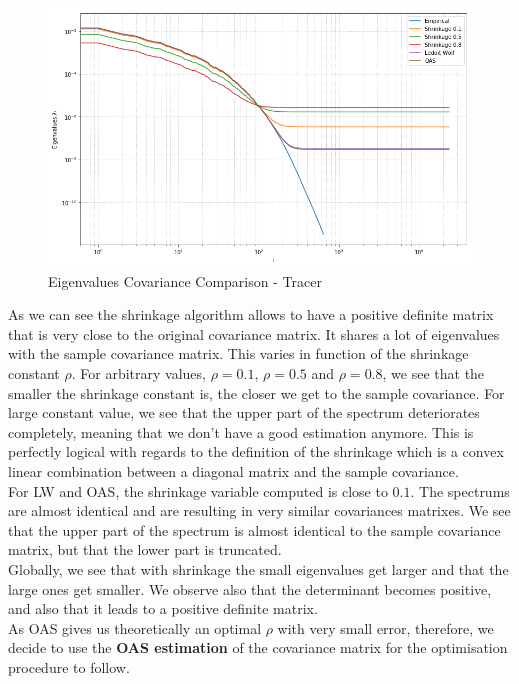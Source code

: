 \begin{figure}[h!]
\centering
    \includegraphics[width=0.8\linewidth]{figures/Covariance/Tracer_23643/cov_all_eigenval_loglog_zoom}
    \caption{Eigenvalues Covariance Comparison - Tracer}
    \label{fig:cov:comparison:eigs}
\end{figure}

As we can see the shrinkage algorithm allows to have a positive definite matrix that is very close to the original covariance matrix. It shares a lot of eigenvalues with the sample covariance matrix. This varies in function of the shrinkage constant $\rho$. For arbitrary values, $\rho = 0.1$,  $\rho= 0.5$ and  $\rho= 0.8$, we see that the smaller the shrinkage constant is, the closer we get to the sample covariance. For large constant value, we see that the upper part of the spectrum deteriorates completely, meaning that we don't have a good estimation anymore. This is perfectly logical with regards to the definition of the shrinkage which is a convex linear combination between a diagonal matrix and the sample covariance. \\

For LW and OAS, the shrinkage variable computed is close to $0.1$. The spectrums are almost identical and are resulting in very similar covariances matrixes. We see that the upper part of the spectrum is almost identical to the sample covariance matrix, but that the lower part is truncated. \\


Globally, we see that with shrinkage  the small eigenvalues get larger and that the large ones get smaller. We observe also that the determinant becomes positive, and also that it leads to a positive definite matrix. \\

As OAS gives us theoretically an optimal $\rho$ with very small error, therefore, we decide to use the \textbf{OAS estimation} of the covariance matrix for the optimisation procedure to follow.

